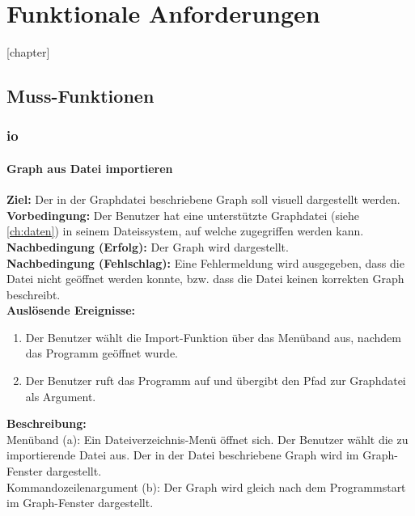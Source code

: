 \chapter{Funktionale Anforderungen}
\label{ch:funktionen}

[chapter]
\setcounter{fanr}{10}
\newcommand{\fano}[1]{\subsubsection{#1}\addtocounter{fanr}{10}}
\newcommand{\subfano}[1]{\subsubsection{#1}\addtocounter{fanr}{1}}
\renewcommand\thesubsubsection{/FA\ifnum\value{fanr}<10 00\else\ifnum\value{fanr}<100 0\fi\fi\arabic{fanr}/}

\section{Muss-Funktionen}
\subsection{\gls{io}}

\fano{Graph aus Datei importieren}\label{fa:import}
\textbf{Ziel:} Der in der Graphdatei beschriebene Graph soll visuell dargestellt werden.\\
\textbf{Vorbedingung:} Der Benutzer hat eine unterstützte Graphdatei (siehe \ref{ch:daten}) in seinem Dateissystem, auf welche zugegriffen werden kann.\\
\textbf{Nachbedingung (Erfolg):} Der Graph wird dargestellt.\\
\textbf{Nachbedingung (Fehlschlag):}
Eine Fehlermeldung wird ausgegeben, dass die Datei nicht geöffnet werden konnte, bzw. dass die Datei keinen korrekten Graph beschreibt.\\
\textbf{Auslösende Ereignisse:}
\begin{enumerate}[nolistsep, label=(\alph*)]
  \item Der Benutzer wählt die Import-Funktion über das Menüband aus, nachdem das Programm geöffnet wurde. %
  \item Der Benutzer ruft das Programm auf und übergibt den Pfad zur Graphdatei als Argument. %
\end{enumerate}
\textbf{Beschreibung:}\\
Menüband (a): Ein Dateiverzeichnis-Menü öffnet sich. %
Der Benutzer wählt die zu importierende Datei aus.
Der in der Datei beschriebene Graph wird im Graph-Fenster dargestellt.\\%
Kommandozeilenargument (b): Der Graph wird gleich nach dem Programmstart im Graph-Fenster dargestellt.


